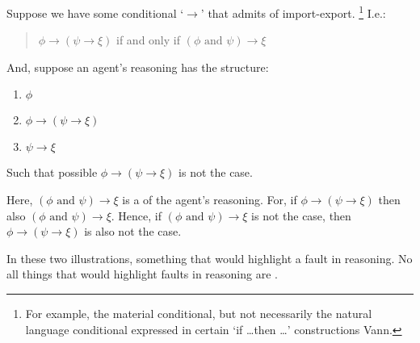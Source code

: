 \begin{note}
  \begin{illustration}
    Suppose we have some conditional `\(\rightarrow\)' that admits of import-export.\nolinebreak
    \footnote{
      For example, the material conditional, but not necessarily the natural language conditional expressed in certain `if \dots then \dots' constructions {\color{red} Vann}.
    }
    I.e.:
    \begin{quote}
      \(\phi \rightarrow (\psi \rightarrow \xi)\) if and only if \((\phi \text{ and } \psi) \rightarrow \xi\)
    \end{quote}
    And, suppose an agent's reasoning has the structure:
    \begin{enumerate}
    \item \(\phi\)
    \item \(\phi \rightarrow (\psi \rightarrow \xi)\)
    \item \(\psi \rightarrow \xi\)
    \end{enumerate}
    Such that possible \(\phi \rightarrow (\psi \rightarrow \xi)\) is not the case.
  \end{illustration}

  Here, \((\phi \text{ and } \psi) \rightarrow \xi\) is a \requ{} of the agent's reasoning.
  For, if \(\phi \rightarrow (\psi \rightarrow \xi)\) then also \((\phi \text{ and } \psi) \rightarrow \xi\).
  Hence, if \((\phi \text{ and } \psi) \rightarrow \xi\) is not the case, then \(\phi \rightarrow (\psi \rightarrow \xi)\) is also not the case.
\end{note}

\begin{note}
  In these two illustrations, something that would highlight a fault in reasoning.
  No all things that would highlight faults in reasoning are .
\end{note}

